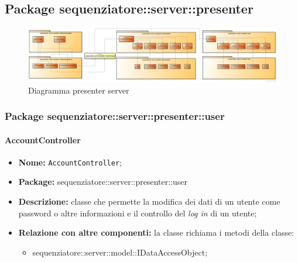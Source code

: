 \subsection{Package sequenziatore::server::presenter}
\begin{figure}[H] \centering \includegraphics[width=%
\textwidth]
{./pack/ClassiServerSoloPresenter.png} \caption{Diagramma presenter server}
\end{figure}
\subsubsection{Package sequenziatore::server::presenter::user}
\paragraph{AccountController}
	\begin{itemize}
		\item \textbf{Nome:} \texttt{AccountController};
		\item \textbf{Package:} sequenziatore::server::presenter::user
		\item \textbf{Descrizione:} classe che permette la modifica dei dati di un utente come password o altre informazioni e il controllo del \textit{log in} di un utente;
		\item \textbf{Relazione con altre componenti:} la classe richiama i metodi della classe:
		\begin{itemize}
			\item sequenziatore::server::model::IDataAccessObject;
		\end{itemize}
	\end{itemize}
